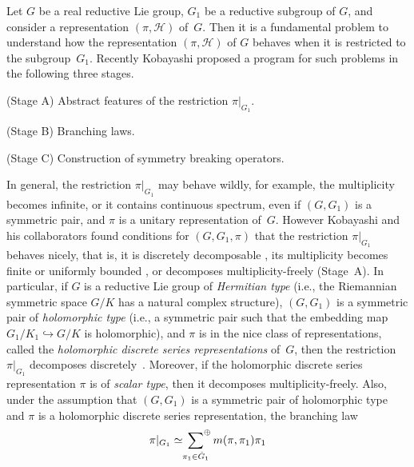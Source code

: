 \documentclass[pdftex]{sigma}
\numberwithin{equation}{section}
\newcommand{\cH}{\mathcal{H}}
\newcommand{\hsum}{\sideset{}{^\oplus}{\sum}}
\begin{document}
Let $G$ be a real reductive Lie group, $G_1$ be a reductive subgroup of $G$, and consider a representation $(\pi,\cH)$ of~$G$. Then it is a fundamental problem to understand how the representation $(\pi,\cH)$ of $G$ behaves
when it is restricted to the subgroup~$G_1$. Recently Kobayashi \cite{K1} proposed a program for such problems in the following three stages.
\begin{description}\itemsep=0pt
\item{(Stage A)} Abstract features of the restriction $\pi|_{G_1}$.
\item{(Stage B)} Branching laws.
\item{(Stage C)} Construction of symmetry breaking operators.
\end{description}
In general, the restriction $\pi|_{G_1}$ may behave wildly, for example, the multiplicity becomes infinite, or it contains continuous spectrum, even if $(G,G_1)$ is a symmetric pair, and $\pi$ is a unitary representation of~$G$. However Kobayashi and his collaborators found conditions for $(G,G_1,\pi)$ that the restriction $\pi|_{G_1}$ behaves nicely, that is, it is discretely decomposable \cite{Kdd1, Kdd2, Kdd3, Kbgg, KyO1, KyO2}, its multiplicity becomes finite or uniformly bounded \cite{Ksf,Kfm1, KM, KtO}, or decomposes multiplicity-freely \cite{Kmf0, Kmf1, Kmf2} (Stage~A). In particular, if $G$ is a reductive Lie group of \textit{Hermitian type}
(i.e., the Riemannian symmetric space $G/K$ has a natural complex structure), $(G,G_1)$ is a symmetric pair of \textit{holomorphic type} (i.e., a symmetric pair such that the embedding map $G_1/K_1\hookrightarrow G/K$ is holomorphic), and $\pi$ is in the nice class of representations, called the \textit{holomorphic discrete series representations} of~$G$, then the restriction $\pi|_{G_1}$ decomposes discretely~\cite{Kdd2, Ma}. Moreover, if the holomorphic discrete series representation $\pi$ is of \textit{scalar type}, then it decomposes multiplicity-freely. Also, under the assumption that $(G,G_1)$ is a symmetric pair of holomorphic type and $\pi$ is a holomorphic discrete series representation, the branching law
\begin{gather*} \pi|_{G_1}\simeq\hsum_{\pi_1\in\hat{G}_1}m(\pi,\pi_1)\pi_1 \end{gather*}
\end{document}
